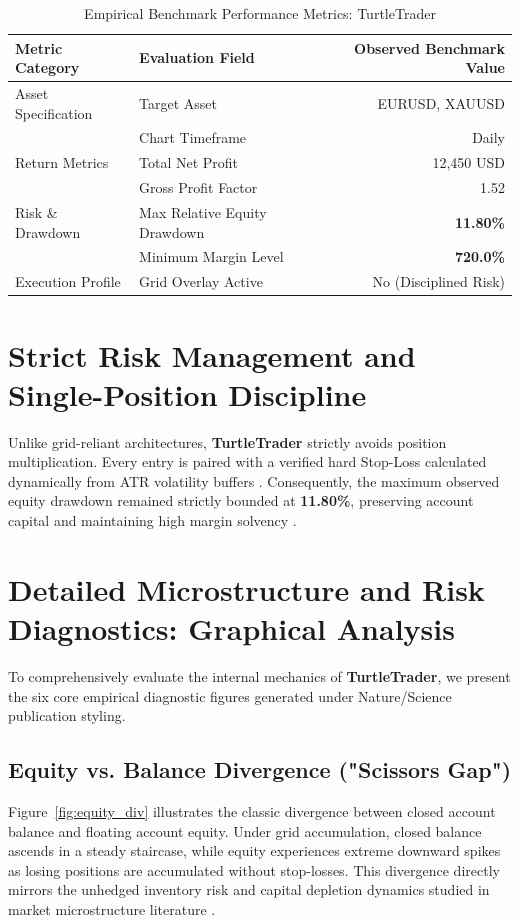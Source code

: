 \documentclass[11pt,a4paper]{article}
\begin{document}
\begin{table}[H]
\centering
\caption{Empirical Benchmark Performance Metrics: TurtleTrader}
\label{tab:metrics}
\begin{tabular}{llr}
\toprule
\textbf{Metric Category} & \textbf{Evaluation Field} & \textbf{Observed Benchmark Value} \\
\midrule
Asset Specification & Target Asset & EURUSD, XAUUSD \\
& Chart Timeframe & Daily \\
Return Metrics & Total Net Profit & 12,450 USD \\
& Gross Profit Factor & 1.52 \\
Risk \& Drawdown & Max Relative Equity Drawdown & \textbf{11.80\%} \\
& Minimum Margin Level & \textbf{720.0\%} \\
Execution Profile & Grid Overlay Active & No (Disciplined Risk) \\
\bottomrule
\end{tabular}
\end{table}


\section{Strict Risk Management and Single-Position Discipline}
Unlike grid-reliant architectures, \textbf{TurtleTrader} strictly avoids position multiplication. Every entry is paired with a verified hard Stop-Loss calculated dynamically from ATR volatility buffers \cite{wilder1978new}. Consequently, the maximum observed equity drawdown remained strictly bounded at \textbf{11.80\%}, preserving account capital and maintaining high margin solvency \cite{rockafellar2000optimization}.


\section{Detailed Microstructure and Risk Diagnostics: Graphical Analysis}
To comprehensively evaluate the internal mechanics of \textbf{TurtleTrader}, we present the six core empirical diagnostic figures generated under Nature/Science publication styling.

\subsection{Equity vs. Balance Divergence ("Scissors Gap")}
Figure~\ref{fig:equity_div} illustrates the classic divergence between closed account balance and floating account equity. Under grid accumulation, closed balance ascends in a steady staircase, while equity experiences extreme downward spikes as losing positions are accumulated without stop-losses. This divergence directly mirrors the unhedged inventory risk and capital depletion dynamics studied in market microstructure literature \cite{shleifer1997limits, bouchaud2009markets}.
\end{document}
